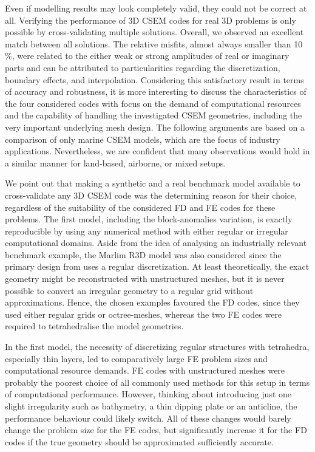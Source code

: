 \documentclass[
    paper,
  ]{geophysics}
\begin{document}
Even if modelling results may look completely valid, they could not be correct at all. Verifying the performance of 3D CSEM codes for real 3D problems is only possible by cross-validating multiple solutions. Overall, we observed an excellent match between all solutions. The relative misfits, almost always smaller than 10\,\%, were related to the either weak or strong amplitudes of real or imaginary parts and can be attributed to particularities regarding the discretization, boundary effects, and interpolation. Considering this satisfactory result in terms of accuracy and robustness, it is more interesting to discuss the characteristics of the four considered codes with focus on the demand of computational resources and the capability of handling the investigated CSEM geometries, including the very important underlying mesh design. The following arguments are based on a comparison of only marine CSEM models, which are the focus of industry applications. Nevertheless, we are confident that many observations would hold in a similar manner for land-based, airborne, or mixed setups.

We point out that making a synthetic and a real benchmark model available to cross-validate any 3D CSEM code was the determining reason for their choice, regardless of the suitability of the considered FD and FE codes for these problems. The first model, including the block-anomalies variation, is exactly reproducible by using any numerical method with either regular or irregular computational domains. Aside from the idea of analysing an industrially relevant benchmark example, the Marlim R3D model was also considered since the primary design from \cite{GEO.19.Correa} uses a regular discretization. At least theoretically, the exact geometry might be reconstructed with unstructured meshes, but it is never possible to convert an irregular geometry to a regular grid without approximations. Hence, the chosen examples favoured the FD codes, since they used either regular grids or octree-meshes, whereas the two FE codes were required to tetrahedralise the model geometries.

In the first model, the necessity of discretizing regular structures with tetrahedra, especially thin layers, led to comparatively large FE problem sizes and computational resource demands. FE codes with unstructured meshes were probably the poorest choice of all commonly used methods for this setup in terms of computational performance. However, thinking about introducing just one slight irregularity such as bathymetry, a thin dipping plate or an anticline, the performance behaviour could likely switch. All of these changes would barely change the problem size for the FE codes, but significantly increase it for the FD codes if the true geometry should be approximated sufficiently accurate.
\end{document}
